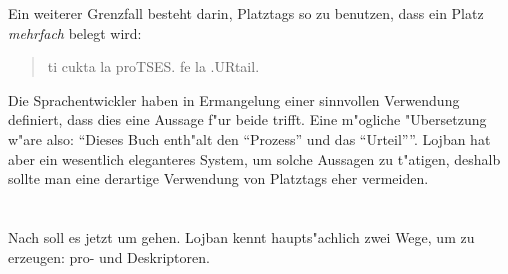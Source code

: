 Ein weiterer Grenzfall besteht darin, Platztags so zu benutzen, dass ein Platz \emph{mehrfach} belegt wird:
\begin{quote}
ti cukta la proTSES. fe la .URtail.
\end{quote}
Die Sprachentwickler haben in Ermangelung einer sinnvollen Verwendung definiert, dass dies eine Aussage f"ur beide  trifft. Eine m"ogliche "Ubersetzung w"are also:
``Dieses Buch enth"alt den ``Prozess'' und das ``Urteil''''. Lojban hat aber ein wesentlich eleganteres System, um solche Aussagen zu t"atigen, deshalb sollte man
eine derartige Verwendung von Platztags eher vermeiden.

\section{}
Nach  soll es jetzt um  gehen. Lojban kennt haupts"achlich zwei Wege, um  zu erzeugen: pro- und Deskriptoren.

